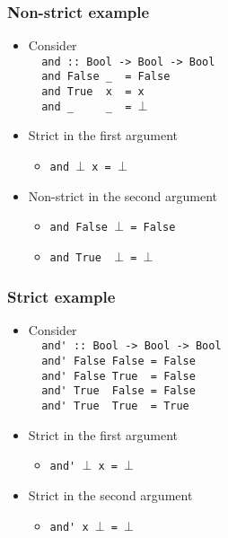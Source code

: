 \documentclass{beamer}
\begin{document}
\begin{frame}[fragile]
    \frametitle{Non-strict example}

\begin{itemize}
    \item Consider \\
    \verb?  and :: Bool -> Bool -> Bool?\\
    \verb?  and False _  = False?\\
    \verb?  and True  x  = x?\\
    \verb?  and _     _  = ?$\bot$\\
    \item Strict in the first argument
    \begin{itemize}
        \item \verb?and ?$\bot$\verb? x = ?$\bot$
    \end{itemize}
    \item Non-strict in the second argument
    \begin{itemize}
        \item \verb?and False ?$\bot$\verb? = False?
        \item \verb?and True  ?$\bot$\verb? = ?$\bot$
    \end{itemize}
\end{itemize}

\end{frame}

\begin{frame}[fragile]
    \frametitle{Strict example}

\begin{itemize}
    \item Consider \\
    \verb?  and' :: Bool -> Bool -> Bool?\\
    \verb?  and' False False = False?\\
    \verb?  and' False True  = False?\\
    \verb?  and' True  False = False?\\
    \verb?  and' True  True  = True?\\
    \item Strict in the first argument
    \begin{itemize}
        \item\verb?and' ?$\bot$\verb? x = ?$\bot$
    \end{itemize}

    \item Strict in the second argument
    \begin{itemize}
        \item\verb?and' x ?$\bot$\verb? = ?$\bot$
    \end{itemize}
\end{itemize}

\end{frame}
\end{document}

